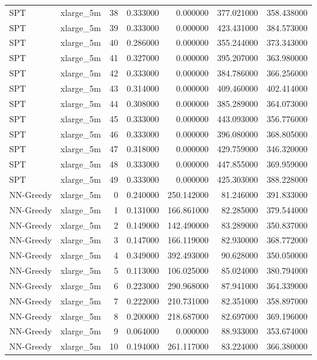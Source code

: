 \begin{tabular}{llrrrrr}
SPT & xlarge_5m & 38 & 0.333000 & 0.000000 & 377.021000 & 358.438000 \\
SPT & xlarge_5m & 39 & 0.333000 & 0.000000 & 423.431000 & 384.573000 \\
SPT & xlarge_5m & 40 & 0.286000 & 0.000000 & 355.244000 & 373.343000 \\
SPT & xlarge_5m & 41 & 0.327000 & 0.000000 & 395.207000 & 363.980000 \\
SPT & xlarge_5m & 42 & 0.333000 & 0.000000 & 384.786000 & 366.256000 \\
SPT & xlarge_5m & 43 & 0.314000 & 0.000000 & 409.460000 & 402.414000 \\
SPT & xlarge_5m & 44 & 0.308000 & 0.000000 & 385.289000 & 364.073000 \\
SPT & xlarge_5m & 45 & 0.333000 & 0.000000 & 443.093000 & 356.776000 \\
SPT & xlarge_5m & 46 & 0.333000 & 0.000000 & 396.080000 & 368.805000 \\
SPT & xlarge_5m & 47 & 0.318000 & 0.000000 & 429.759000 & 346.320000 \\
SPT & xlarge_5m & 48 & 0.333000 & 0.000000 & 447.855000 & 369.959000 \\
SPT & xlarge_5m & 49 & 0.333000 & 0.000000 & 425.303000 & 388.228000 \\
NN-Greedy & xlarge_5m & 0 & 0.240000 & 250.142000 & 81.246000 & 391.833000 \\
NN-Greedy & xlarge_5m & 1 & 0.131000 & 166.861000 & 82.285000 & 379.544000 \\
NN-Greedy & xlarge_5m & 2 & 0.149000 & 142.490000 & 83.289000 & 350.837000 \\
NN-Greedy & xlarge_5m & 3 & 0.147000 & 166.119000 & 82.930000 & 368.772000 \\
NN-Greedy & xlarge_5m & 4 & 0.349000 & 392.493000 & 90.628000 & 350.050000 \\
NN-Greedy & xlarge_5m & 5 & 0.113000 & 106.025000 & 85.024000 & 380.794000 \\
NN-Greedy & xlarge_5m & 6 & 0.223000 & 290.968000 & 87.941000 & 364.339000 \\
NN-Greedy & xlarge_5m & 7 & 0.222000 & 210.731000 & 82.351000 & 358.897000 \\
NN-Greedy & xlarge_5m & 8 & 0.200000 & 218.687000 & 82.697000 & 369.196000 \\
NN-Greedy & xlarge_5m & 9 & 0.064000 & 0.000000 & 88.933000 & 353.674000 \\
NN-Greedy & xlarge_5m & 10 & 0.194000 & 261.117000 & 83.224000 & 366.380000 \\

\end{tabular}
